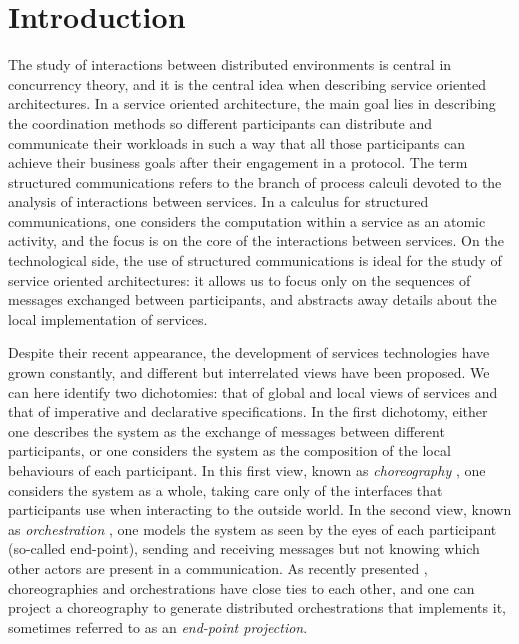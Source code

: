 \section{Introduction}

The study of interactions between distributed environments is central
in concurrency theory, and it is the central idea when describing
service oriented architectures. In a service oriented architecture,
the main goal lies in describing the coordination methods so different
participants can distribute and communicate their workloads in such a
way that all those participants can achieve their business goals after
their engagement in a protocol.
The term structured
communications \cite{honda1998lpa} refers to the branch of process
calculi devoted to the analysis of interactions between services. In a
calculus for structured communications, one considers the computation
within a service as an atomic activity, and the focus is on the core
of  the interactions between services. On the technological
side, the use of structured communications is ideal for the study of
service oriented architectures: it allows us to focus only on the
sequences of messages exchanged between participants, and abstracts away details about the local
implementation of services.

Despite their recent appearance, the development of services technologies have
grown constantly, and different but interrelated views
have been proposed. We
can here identify two dichotomies: that of global and local views of
services and that of imperative and declarative specifications. In the first
dichotomy, either one describes the system as the exchange of messages
between different participants, or one considers the system as the
composition of the local behaviours of each participant. In this first
view, known as \emph{choreography} \cite{kavantzas2004web}, one
considers the system as a whole, taking care only of the interfaces
that participants use when interacting to the outside world. In the
second view, known as \emph{orchestration}
\cite{MisraCook06JSSM}, one models the system as seen
by the eyes of each participant (so-called end-point), sending and
receiving messages but not knowing which other actors are present in a
communication. As recently presented
\cite{carbone7scc,DBLP:conf/coordination/BusiGGLZ06,Hongli2007Exploring-the-C}, choreographies and
orchestrations have close ties to each other, and one can 
project a choreography to generate distributed orchestrations that
implements it, sometimes referred to as an \emph{end-point projection}.

